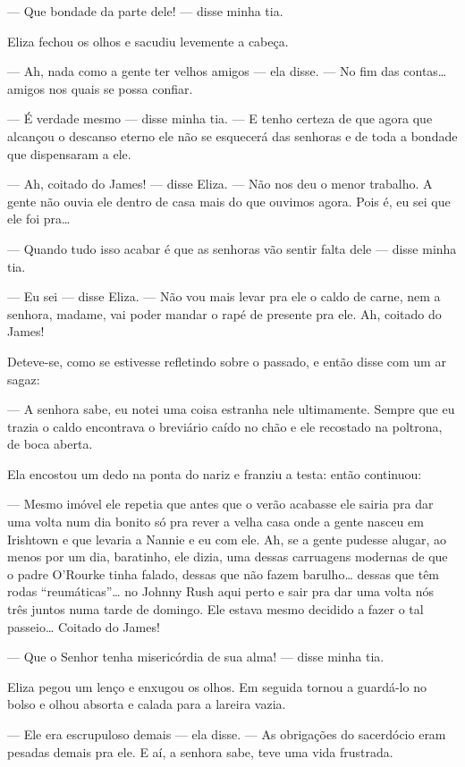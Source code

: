 --- Que bondade da parte dele! --- disse minha tia.

Eliza fechou os olhos e sacudiu levemente a cabeça.

--- Ah, nada como a gente ter velhos amigos --- ela disse.  --- No fim das
contas\ldots{} amigos nos quais se possa confiar.

--- É verdade mesmo --- disse minha tia.  --- E tenho certeza de que agora
que alcançou o descanso eterno ele não se esquecerá das senhoras e de toda a
bondade que dispensaram a ele.

--- Ah, coitado do James! --- disse Eliza.  --- Não nos deu o menor trabalho.
A gente não ouvia ele dentro de casa mais do que ouvimos agora.  Pois é, eu sei
que ele foi pra\ldots{}

--- Quando tudo isso acabar é que as senhoras vão sentir falta dele ---
disse minha tia.

--- Eu sei --- disse Eliza.  --- Não vou mais levar pra ele o caldo de carne,
nem a senhora, madame, vai poder mandar o rapé de presente pra ele.  Ah,
coitado do James!

Deteve-se, como se estivesse refletindo sobre o passado, e então disse com um
ar sagaz:

--- A senhora sabe, eu notei uma coisa estranha nele ultimamente.  Sempre
que eu trazia o caldo encontrava o breviário caído no chão e ele recostado na
poltrona, de boca aberta.

Ela encostou um dedo na ponta do nariz e franziu a testa: então continuou:

--- Mesmo imóvel ele repetia que antes que o verão acabasse ele sairia pra dar
uma volta num dia bonito só pra rever a velha casa onde a gente nasceu em
Irishtown e que levaria a Nannie e eu com ele.  Ah, se a gente pudesse alugar,
ao menos por um dia, baratinho, ele dizia, uma dessas carruagens modernas de
que o padre O’Rourke tinha falado, dessas que não fazem barulho\ldots{} dessas
que têm rodas ``reumáticas''\ldots{} no Johnny Rush aqui perto e sair pra dar uma
volta nós três juntos numa tarde de domingo.  Ele estava mesmo decidido a fazer
o tal passeio\ldots{} Coitado do James!

--- Que o Senhor tenha misericórdia de sua alma! --- disse minha tia.

Eliza pegou um lenço e enxugou os olhos.  Em seguida tornou a guardá-lo no
bolso e olhou absorta e calada para a lareira vazia.

--- Ele era escrupuloso demais --- ela disse.  --- As obrigações do sacerdócio
eram pesadas demais pra ele.  E aí, a senhora sabe, teve uma vida frustrada.

